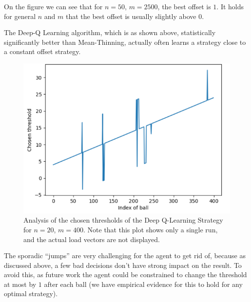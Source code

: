 
On the figure we can see that for $n=50$, $m=2500$, the best offset is $1$. It holds for general $n$ and $m$ that the best offset is usually slightly above $0$.

The Deep-Q Learning algorithm, which is as shown above, statistically significantly better than Mean-Thinning, actually often learns a strategy close to a constant offset strategy.


\begin{figure}[hbt!] \label{two-thinning-dqn-thresholds}
    \centering
    \includegraphics[scale=1.0]{Chapter4/Figs/dqn_learnt_thresholds.png}
    \caption{Analysis of the chosen thresholds of the Deep Q-Learning Strategy for $n=20$, $m=400$. Note that this plot shows only a single run, and the actual load vectors are not displayed.}
\end{figure}



The sporadic ``jumps'' are very challenging for the agent to get rid of, because as discussed above, a few bad decisions don't have strong impact on the result. To avoid this, as future work the agent could be constrained to change the threshold at most by $1$ after each ball (we have empirical evidence for this to hold for any optimal strategy).



